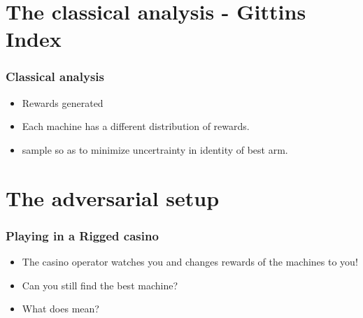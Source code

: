 \documentclass[handout]{beamer}
\begin{document}
\section{The classical analysis - Gittins Index}

\begin{frame}
\frametitle{Classical analysis}
\begin{itemize}
\item Rewards generated 
\item Each machine has a different distribution of rewards.
\item {} sample so as to minimize uncertrainty in identity of
  best arm.
\end{itemize}
\end{frame}

\section{The adversarial setup}

\begin{frame}
\frametitle{Playing in a Rigged casino}
\begin{itemize}
\item The casino operator watches you and changes rewards of the
  machines to  you!
\item Can you still find the best machine?
\item What does  mean?
\end{itemize}
\end{frame}
\end{document}
